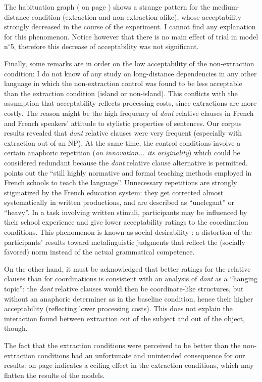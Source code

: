 The habituation graph ( on page \pageref{fig:exp01-habituation}) shows a strange pattern for the medium-distance condition (extraction and non-extraction alike), whose acceptability strongly decreased in the course of the experiment. I cannot find any explanation for this phenomenon. Notice however that there is no main effect of trial in model n$^{\circ}$5, therefore this decrease of acceptability was not significant.

Finally, some remarks are in order on the low acceptability of the non-extraction condition: I do not know of any study on long-distance dependencies in any other language in which the non-extraction control was found to be less acceptable than the extraction condition (island or non-island). This conflicts with the assumption that acceptability reflects processing costs, since extractions are more costly. The reason might be the high frequency of \emph{dont} relative clauses in French and French speakers' attitude to stylistic properties of sentences. Our corpus results revealed that \emph{dont} relative clauses were very frequent (especially with extraction out of an NP). At the same time, the control conditions involve a certain anaphoric repetition (\emph{an innovation... its originality}) which could be considered redundant because the \emph{dont} relative clause alternative is permitted. \citet[133]{Armstrong.2001} points out the ``still highly normative and formal teaching methods employed in French schools to teach the language''. Unnecessary repetitions are strongly stigmatized by the French education system: they get corrected almost systematically in written productions, and are described as ``unelegant'' or ``heavy''. In a task involving written stimuli, participants may be influenced by their school experience and give lower acceptability ratings to the coordination conditions. This phenomenon is known as social desirability \citep{Edwards.1957}: a distortion of the participants' results toward metalinguistic judgments that reflect the (socially favored) norm instead of the actual grammatical competence.

On the other hand, it must be acknowledged that better ratings for the relative clauses than for coordinations is consistent with an analysis of \emph{dont} as a ``hanging topic'': the \emph{dont} relative clauses would then be coordinate-like structures, but without an anaphoric determiner as in the baseline condition, hence their higher acceptability (reflecting lower processing costs). This does not explain the interaction found between extraction out of the subject and out of the object, though.

The fact that the extraction conditions were perceived to be better than the non-extraction conditions had an unfortunate and unintended consequence for our results:  on page \pageref{fig:exp01-repartition} indicates a ceiling effect in the extraction conditions, which may flatten the results of the models.

